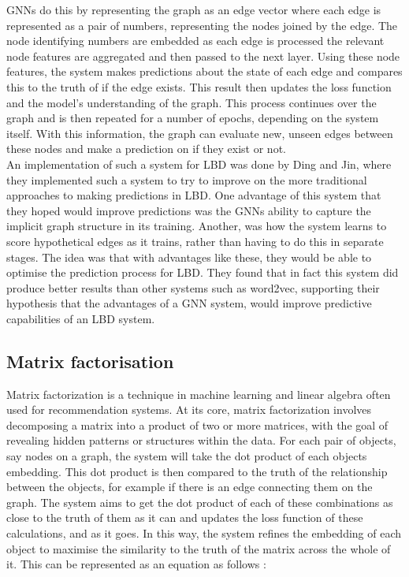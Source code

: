 \documentclass{l4proj}
\begin{document}
GNNs do this by representing the graph as an edge vector where each edge is represented as a pair of numbers, representing the nodes joined by the edge. The node identifying numbers are embedded as each edge is processed the relevant node features are aggregated and then passed to the next layer. Using these node features, the system makes predictions about the state of each edge and compares this to the truth of if the edge exists. This result then updates the loss function and the model's understanding of the graph. This process continues over the graph and is then repeated for a number of epochs, depending on the system itself. With this information, the graph can evaluate new, unseen edges between these nodes and make a prediction on if they exist or not. \\

An implementation of such a system for LBD was done by Ding and Jin, where they implemented such a system to try to improve on the more traditional approaches to making predictions in LBD. One advantage of this system that they hoped would improve predictions was the GNNs ability to capture the implicit graph structure in its training. Another, was how the system learns to score hypothetical edges as it trains, rather than having to do this in separate stages. The idea was that with advantages like these, they would be able to optimise the prediction process for LBD. They found that in fact this system did produce better results than other systems such as word2vec, supporting their hypothesis that the advantages of a GNN system, would improve predictive capabilities of an LBD system. \\

\subsection{Matrix factorisation}

Matrix factorization is a technique in machine learning and linear algebra often used for recommendation systems. At its core, matrix factorization involves decomposing a matrix into a product of two or more matrices, with the goal of revealing hidden patterns or structures within the data. For each pair of objects, say nodes on a graph, the system will take the dot product of each objects embedding. This dot product is then compared to the truth of the relationship between the objects, for example if there is an edge connecting them on the graph. The system aims to get the dot product of each of these combinations as close to the truth of them as it can and updates the loss function of these calculations, and as it goes. In this way, the system refines the embedding of each object to maximise the similarity to the truth of the matrix across the whole of it. This can be represented as an equation as follows :\\
\end{document}
